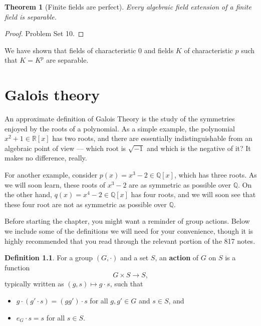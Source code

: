 \documentclass[12pt]{report}
\newtheorem{theorem}{Theorem}[chapter]
\numberwithin{equation}{section}
\numberwithin{theorem}{chapter}
\theoremstyle{definition}
\newtheorem{definition}[theorem]{Definition}
\newtheorem*{basic properties}{Basic Properties}
\newtheorem*{Important Remark}{Important Remark}
\newcommand{\df}[1]{{\bf #1}\index{#1}}
\begin{document}
\begin{theorem}[Finite fields are perfect]\label{alg ext finite field separable}
 Every algebraic field extension of a finite field is separable.
\end{theorem}


\begin{proof}
	Problem Set 10.
\end{proof}


We have shown that fields of characteristic $0$ and fields $K$ of characteristic $p$ such that $K=K^p$ are separable.






\chapter{Galois theory}



An approximate definition of Galois Theory is the study of the symmetries enjoyed by the roots of a polynomial. As a simple example, the polynomial $x^2 + 1 \in \mathbb{R}[x]$ has two roots, and there are essentially indistinguishable from an algebraic point of view --- which root is $\sqrt{-1}$ and which is the negative of it? It makes no difference, really.

For another example, consider $p(x) = x^3 -2 \in \mathbb{Q}[x]$, which has three roots. As we will soon learn, these roots of $x^3 - 2$ are as symmetric as possible over $\mathbb{Q}$. On the other hand, $q(x) = x^4 - 2 \in \mathbb{Q}[x]$ has four roots, and we will soon see that these four root are not as symmetric as possible over $\mathbb{Q}$. 





Before starting the chapter, you might want a reminder of group actions. Below we include some of the definitions we will need for your convenience, though it is highly recommended that you read through the relevant portion of the 817 notes.

\begin{definition}
For a group $(G, \cdot)$ and a set $S$, an \df{action} of $G$ on $S$ is a function
$$G \times S \to S,$$
typically written as $(g,s) \mapsto g \cdot s$, such that
\begin{itemize}
\item $g \cdot (g' \cdot s) = (g g') \cdot s$ for all $g,g' \in G$ and $s\in S$, and
\item $e_G \cdot s = s$ for all $s \in S$.
\end{itemize}
\end{definition}
\end{document}
